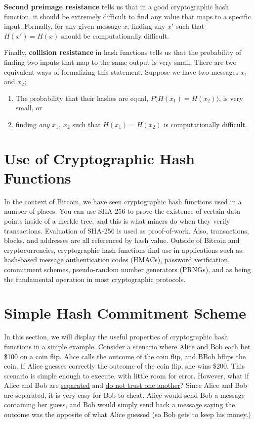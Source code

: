 \documentclass[11pt]{article}
\begin{document}
   \textbf{Second preimage resistance} tells us that in a good cryptographic hash function, it should be extremely difficult to find any value that maps to a specific input. Formally, for any given message $x$, finding any $x'$ such that $H(x') = H(x)$ should be computationally difficult.
   
   Finally, \textbf{collision resistance} in hash functions tells us that the probability of finding two inputs that map to the same output is very small. There are two equivalent ways of formalizing this statement. Suppose we have two messages $x_1$ and $x_2$;
   
   \begin{enumerate}
       \item The probability that their hashes are equal, $P\big(H(x_1) = H(x_2)\big)$, is very small, or
       \item finding \textit{any} $x_1,~x_2$ such that $H(x_1)=H(x_2)$ is computationally difficult.
   \end{enumerate}
   
   \section*{Use of Cryptographic Hash Functions}
   
   In the context of Bitcoin, we have seen cryptographic hash functions used in a number of places. You can use SHA-256 to prove the existence of certain data points inside of a merkle tree, and this is what miners do when they verify transactions. Evaluation of SHA-256 is used as proof-of-work. Also, transactions, blocks, and addresses are all referenced by hash value. Outside of Bitcoin and cryptocurrencies, cryptographic hash functions find use in applications such as: hash-based message authentication codes (HMACs), password verification, commitment schemes, pseudo-random number generators (PRNGs), and as being the fundamental operation in most cryptographic protocols. 
   
    \section*{Simple Hash Commitment Scheme}
   
    In this section, we will display the useful properties of cryptographic hash functions in a simple example. Consider a scenario where Alice and Bob each bet \$100 on a coin flip. Alice calls the outcome of the coin flip, and BBob bflips the coin. If Alice guesses correctly the outcome of the coin flip, she wins \$200. This scenario is simple enough to execute, with little room for error. However, what if Alice and Bob are \underline{separated} and \underline{do not trust one another}? Since Alice and Bob are separated, it is very easy for Bob to cheat. Alice would send Bob a message containing her guess, and Bob would simply send back a message saying the outcome was the opposite of what Alice guessed (so Bob gets to keep his money.)
    
\end{document}
